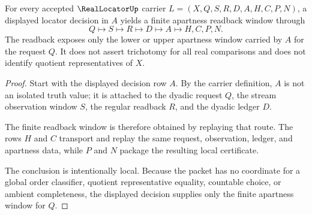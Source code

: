 \begin{theorem}
\label{thm:real-locator-apartness-decision-window}
For every accepted $\RealLocatorUp$ carrier $L=(X,Q,S,R,D,A,H,C,P,N)$, a displayed locator decision in $A$ yields a finite apartness readback window through
$$
Q\longmapsto S\longmapsto R\longmapsto D\longmapsto A\longmapsto H,C,P,N .
$$
The readback exposes only the lower or upper apartness window carried by $A$ for the request $Q$. It does not assert trichotomy for all real comparisons and does not identify quotient representatives of $X$.
\end{theorem}
\begin{proof}
Start with the displayed decision row $A$. By the carrier definition, $A$ is not an isolated truth value; it is attached to the dyadic request $Q$, the stream observation window $S$, the regular readback $R$, and the dyadic ledger $D$.

The finite readback window is therefore obtained by replaying that route. The rows $H$ and $C$ transport and replay the same request, observation, ledger, and apartness data, while $P$ and $N$ package the resulting local certificate.

The conclusion is intentionally local. Because the packet has no coordinate for a global order classifier, quotient representative equality, countable choice, or ambient completeness, the displayed decision supplies only the finite apartness window for $Q$.
\end{proof}


\begin{closurestatus}{\RealLocatorUp}
  \theoryclosure{\seedClosure}
  \formalstatus{\unformalizedV}
\end{closurestatus}
